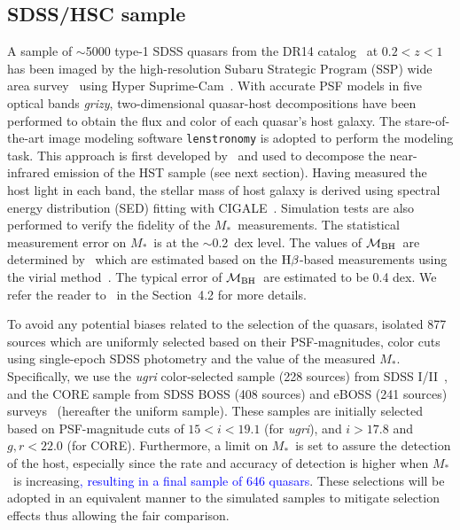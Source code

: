 \documentclass[twocolumn]{aastex631}
\newcommand{\blue}[1]{\textcolor{blue}{#1}}
\def\smass{{$M_*$}}
\def\hbeta{${\rm H}\beta$}
\def\mbh{$\mathcal M_{\rm BH}$}
\begin{document}
\subsection{SDSS/HSC sample}\label{sec:hsc}
A sample of $\sim$5000 type-1 SDSS quasars from the DR14 catalog~\citep{Paris2018} at $0.2<z<1$ has been imaged by the high-resolution Subaru Strategic Program (SSP) wide area survey~\citep{Aihara2019} using Hyper Suprime-Cam~\citep{Miyazaki2018}. With accurate PSF models in five optical bands {\it grizy}, two-dimensional quasar-host decompositions have been performed \citep[][hereafter L21a]{Li2021a} to obtain the flux and color of each quasar's host galaxy. The stare-of-the-art image modeling software {\tt lenstronomy} \citep{Birrer2015, Birrer2018, Birrer2021} is adopted to perform the modeling task. This approach is first developed by~\citet{Ding2020} and used to decompose the near-infrared emission of the HST sample (see next section). Having measured the host light in each band, the stellar mass of host galaxy is derived using spectral energy distribution (SED) fitting with CIGALE~\citep{Boquien2019}. Simulation tests are also performed to verify the fidelity of the \smass\ measurements. The statistical measurement error on \smass\ is at the $\sim$0.2~dex level. The values of \mbh\ are determined by~\citet{Rakshit2020} which are estimated based on the \hbeta-based measurements using the virial method~\citep{Peterson2004, Vestergaard2006}. The typical error of \mbh\ are estimated to be 0.4 dex. We refer the reader to~\citet{Li2021a} in the Section~4.2 for more details.

To avoid any potential biases related to the selection of the quasars, \citet{2021arXiv210902751L} isolated 877 sources which are uniformly selected based on their PSF-magnitudes, color cuts using single-epoch SDSS photometry and the value of the measured \smass. Specifically, we use the {\it ugri} color-selected sample (228 sources) from SDSS I/II~\citep{Richards2002}, and the CORE sample from SDSS BOSS (408 sources) and eBOSS (241 sources) surveys~\citep{Ross2013, Myers2015} (hereafter the uniform sample). These samples are initially selected based on PSF-magnitude cuts of $15 < i < 19.1$ (for {\it ugri}), and $i > 17.8$ and $g, r < 22.0$ (for CORE). Furthermore, a limit on \smass\ is set to assure the detection of the host, especially since the rate and accuracy of detection is higher when \smass\ is increasing\blue{, resulting in a final sample of 646 quasars}. These selections will be adopted in an equivalent manner to the simulated samples to mitigate selection effects thus allowing the fair comparison.
\end{document}
